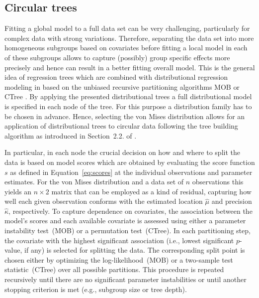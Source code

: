 \documentclass[nojss]{jss}
\numberwithin{equation}{section}
\begin{document}
\subsection{Circular trees}
\label{sec:circtree}
Fitting a global model to a full data set can be very challenging, particularly for 
complex data with strong variations. Therefore, separating the data set into more homogeneous 
subgroups based on covariates before fitting a local model in each of these subgroups allows 
to capture (possibly) group specific effects more precisely and hence can result in a better 
fitting overall model.
This is the general idea of regression trees which are combined with distributional regression
modeling in \cite{Schlosser+Hothorn+Stauffer:2019} based on the unbiased recursive partitioning 
algorithms MOB \citep{Zeileis+Hothorn+Hornik:2008} or CTree \citep{Hothorn+Hornik+Zeileis:2006}.
By applying the presented distributional trees a full distributional model is specified in each 
node of the tree. For this purpose a distribution family has to be chosen in advance. Hence, 
selecting the von Mises distribution allows for an application of distributional trees to circular
data following the tree building algorithm as introduced in Section~2.2. of 
\cite{Schlosser+Hothorn+Stauffer:2019}. 

In particular, in each node the crucial decision on how and where to split the data is based on model
scores which are obtained by evaluating the score function $s$ as defined in Equation~\ref{eq:scores} 
at the individual observations and parameter estimates. For the von Mises distribution and a data set 
of $n$ observations this yields an $n \times 2$ matrix that can be employed as a kind of residual,
capturing how well each given observation conforms with the estimated location $\hat{\mu}$ and precision
$\hat{\kappa}$, respectively.
To capture dependence on covariates, the association between the model's scores and each available
covariate is assessed using either a parameter instability test~(MOB) or a permutation test~(CTree).
In each partitioning step, the covariate with the highest significant association (i.e., lowest
significant $p$-value, if any) is selected for splitting the data. The corresponding split point
is chosen either by optimizing the log-likelihood~(MOB) or a two-sample test statistic~(CTree)
over all possible partitions.
This procedure is repeated recursively until there are no significant parameter instabilities or until another stopping criterion is met (e.g., subgroup size or tree depth).
\end{document}
